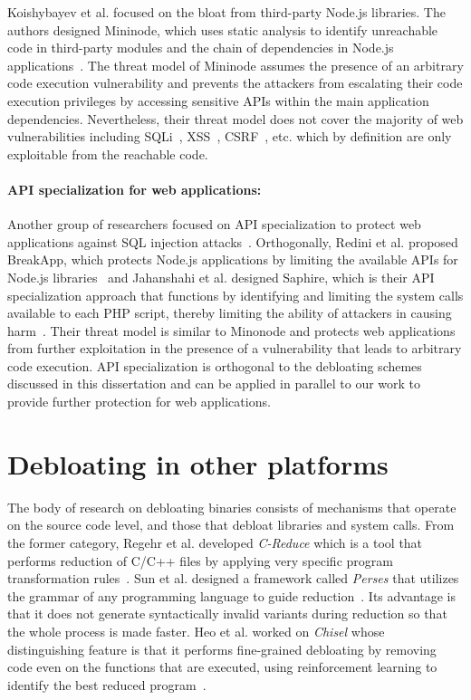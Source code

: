 Koishybayev et al. focused on the bloat from third-party Node.js libraries. 
The authors designed Mininode, which uses static analysis to identify unreachable code in third-party modules and the chain of dependencies in Node.js applications~\cite{mininode}. 
The threat model of Mininode assumes the presence of an arbitrary code execution vulnerability and prevents the attackers from escalating their code execution privileges by accessing sensitive APIs within the main application dependencies. 
Nevertheless, their threat model does not cover the majority of web vulnerabilities including SQLi~\cite{sqlInjection}, XSS~\cite{xss}, CSRF~\cite{csrf}, etc. which by definition are only exploitable from the reachable code. 

\paragraph{API specialization for web applications:} Another group of researchers focused on API specialization to protect web applications against SQL injection attacks~\cite{jahanshahi2020you}.
Orthogonally, Redini et al. proposed BreakApp, which protects Node.js applications by limiting the available APIs for Node.js libraries~\cite{vasilakis2018breakapp} and Jahanshahi et al. designed Saphire, which is their API specialization approach that functions by identifying and limiting the system calls available to each PHP script, thereby limiting the ability of attackers in causing harm~\cite{saphire}. 
Their threat model is similar to Minonode and protects web applications from further exploitation in the presence of a vulnerability that leads to arbitrary code execution. 
API specialization is orthogonal to the debloating schemes discussed in this dissertation and can be applied in parallel to our work to provide further protection for web applications. 


\section{Debloating in other platforms}

The body of research on debloating binaries consists of mechanisms that operate on the source code level, and those that debloat libraries and system calls. 
From the former category, Regehr et al. developed \textit{C-Reduce} which is a tool that performs reduction of C/C++ files by applying very specific program transformation rules~\cite{regehr2012CReduce}.
Sun et al. designed a framework called \textit{Perses} that utilizes the grammar of any programming language to guide reduction~\cite{sun2018perses}.
Its advantage is that it does not generate syntactically invalid variants during reduction so that the whole process is made faster.
Heo et al. worked on \textit{Chisel} whose distinguishing feature is that it performs fine-grained debloating by removing code even on the functions that are executed, using reinforcement learning to identify the best reduced program~\cite{heo2018effective}.

